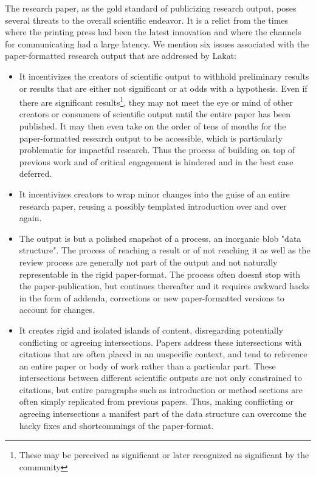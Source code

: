 \documentclass[14pt]{article}
\begin{document}
The research paper, as the gold standard of publicizing research output, poses several threats to the overall scientific endeavor. It is a relict from the times where the printing press had been the latest innovation and where the channels for communicating had a large latency.  We mention six issues associated with the paper-formatted research output that are addressed by Lakat:
\begin{itemize}

 \item It incentivizes the creators of scientific output to withhold preliminary results or results that are either not significant or at odds with a hypothesis. Even if there are significant results\footnote{These may be perceived as significant or later recognized as significant by the community}, they may not meet the eye or mind of other creators or consumers of scientific output until the entire paper has been published. It may then even take on the order of tens of months for the paper-formatted research output to be accessible, which is particularly problematic for impactful research. Thus the process of building on top of previous work and of critical engagement is hindered and in the best case deferred.
 
\item It incentivizes creators to wrap minor changes into the guise of an entire research paper, reusing a possibly templated introduction over and over again. 

\item The output is but a polished snapshot of a process, an inorganic blob "data structure". The process of reaching a result or of not reaching it as well as the review process are generally not part of the output and not naturally representable in the rigid paper-format. The process often doesn\'t stop with the paper-publication, but continues thereafter and it requires awkward hacks in the form of addenda, corrections or new paper-formatted versions to account for changes.

\item It creates rigid and isolated islands of content, disregarding potentially conflicting or agreeing intersections. Papers address these intersections with citations that are often placed in an unspecific context, and tend to reference an entire paper or body of work rather than a particular part. These intersections between different scientific outputs are not only constrained to citations, but entire paragraphs such as introduction or method sections are often simply replicated from previous papers. Thus, making conflicting or agreeing intersections a manifest part of the data structure can overcome the hacky fixes and shortcommings of the paper-format.


\end{itemize}
\end{document}
